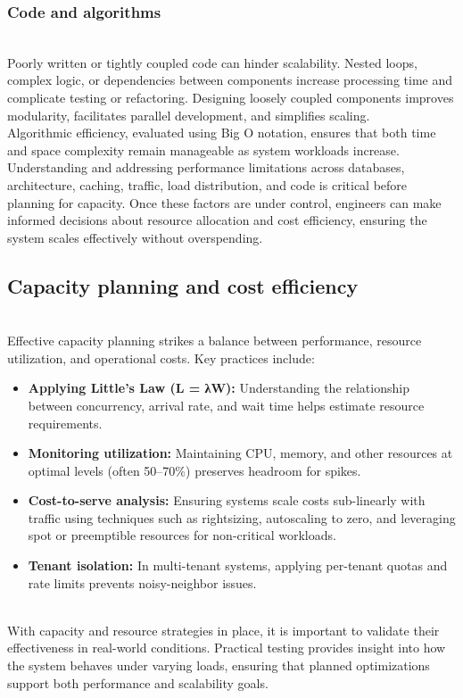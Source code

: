 \subsubsection{Code and algorithms}\label{SKhAyRJ-rJSIBl83Pdz6j}
\\
Poorly written or tightly coupled code can hinder scalability. Nested loops, complex logic, or dependencies between components increase processing time and complicate testing or refactoring. Designing loosely coupled components improves modularity, facilitates parallel development, and simplifies scaling.
\\
Algorithmic efficiency, evaluated using Big O notation, ensures that both time and space complexity remain manageable as system workloads increase.
\\
Understanding and addressing performance limitations across databases, architecture, caching, traffic, load distribution, and code is critical before planning for capacity. Once these factors are under control, engineers can make informed decisions about resource allocation and cost efficiency, ensuring the system scales effectively without overspending.

\subsection{Capacity planning and cost efficiency}\label{scOxf-vu6Ir04oIN4efFK}
\\
Effective capacity planning strikes a balance between performance, resource utilization, and operational costs. Key practices include:

\begin{itemize}
\item
\protect{}\label{ayCpH1HBJuW19oFxQYbQg}
\textbf{Applying Little's Law (L = λW):} Understanding the relationship between concurrency, arrival rate, and wait time helps estimate resource requirements.
\item
\protect{}\label{ZHoxHcrflehjLxgQoobWs}
\textbf{Monitoring utilization:} Maintaining CPU, memory, and other resources at optimal levels (often 50--70\%) preserves headroom for spikes.
\item
\protect{}\label{viSUsD5vv7jL0KIxm3OZ5}
\textbf{Cost-to-serve analysis:} Ensuring systems scale costs sub-linearly with traffic using techniques such as rightsizing, autoscaling to zero, and leveraging spot or preemptible resources for non-critical workloads.
\item
\protect{}\label{pLeCJvS0AsudW4-eBRrmg}
\textbf{Tenant isolation:} In multi-tenant systems, applying per-tenant quotas and rate limits prevents noisy-neighbor issues.
\end{itemize}
\\
With capacity and resource strategies in place, it is important to validate their effectiveness in real-world conditions. Practical testing provides insight into how the system behaves under varying loads, ensuring that planned optimizations support both performance and scalability goals.

